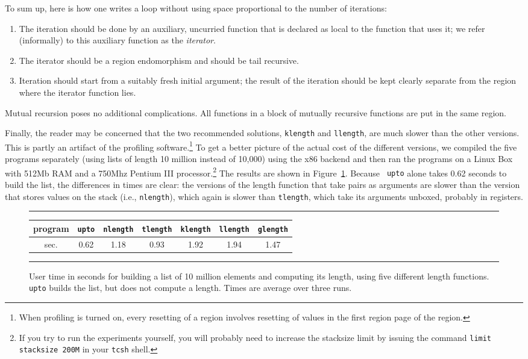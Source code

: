 \documentclass[12pt]{book}
\begin{document}
To sum up, here is how one writes a loop without using space
proportional to the number of iterations:
%
\begin{enumerate}
\item The iteration should be done by an auxiliary, uncurried function
  that is declared as local to the function that uses it; we refer
  (informally) to this auxiliary function as the
  {\em iterator}.
\item The iterator should be a
  region endomorphism and should be tail recursive.
\item Iteration should start from a suitably fresh initial argument;
  the result of the iteration should be kept clearly separate from the
  region where the iterator function lies.
\end{enumerate}
Mutual recursion poses no additional complications. All functions in a
block of mutually recursive functions are put in the same region.

Finally, the reader may be concerned that the two recommended
solutions, {\tt klength} and {\tt llength}, are much slower than the
other versions. This is partly an artifact of the profiling
software.\footnote{When profiling is turned on, every resetting of a
  region involves resetting of values in the first region page of the
  region.} To get a better picture of the actual cost of the different
versions, we compiled the five programs separately (using lists of
length 10 million instead of 10,000) using the x86 backend and then
ran the programs on a Linux Box with 512Mb RAM and a 750Mhz Pentium
III processor.\footnote{If you try to run the experiments yourself,
  you will probably need to increase the stacksize limit by issuing
  the command {\tt limit stacksize 200M} in your {\tt tcsh} shell.}
The results are shown in Figure~\ref{length.timing.fig}. Because {\tt
  upto} alone takes 0.62 seconds to build the list, the differences in
times are clear: the versions of the length function that take pairs
as arguments are slower than the version that stores values on the
stack (i.e., {\tt nlength}), which again is slower than {\tt tlength},
which take its arguments unboxed, probably in registers.

\begin{figure}
\hrule
\medskip
\begin{center}
\begin{tabular}{|c|c|c|c|c|c|c|}\hline
program      & {\tt upto} & {\tt nlength} & {\tt tlength} & {\tt klength} & {\tt llength} & {\tt glength} \\ \hline
sec. & 0.62 & 1.18 & 0.93 & 1.92 & 1.94 & 1.47 \\ \hline
\end{tabular}
\end{center}
\caption{User time in seconds for building a list of 10 million elements and
computing its length, using five different length functions. {\tt upto} builds
the list, but does not compute a length. Times are average
over three runs.}
\label{length.timing.fig}
\medskip
\hrule
\end{figure}
\end{document}
